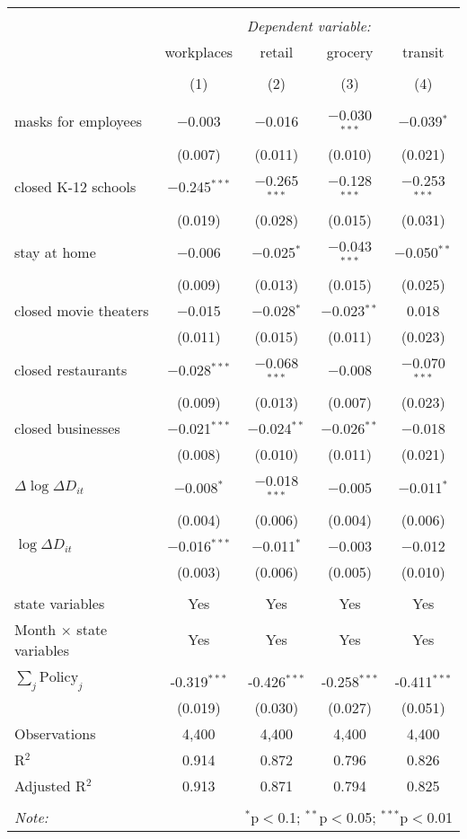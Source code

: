 \begin{tabular}{@{\extracolsep{1pt}}lcccc} 
\\[-1.8ex]\hline 
\hline \\[-1.8ex] 
 & \multicolumn{4}{c}{\textit{Dependent variable:}} \\ 
\cline{2-5} 
 & workplaces & retail & grocery & transit \\ 
\\[-1.8ex] & (1) & (2) & (3) & (4)\\ 
\hline \\[-1.8ex] 
 masks for employees & $-$0.003 & $-$0.016 & $-$0.030$^{***}$ & $-$0.039$^{*}$ \\ 
  & (0.007) & (0.011) & (0.010) & (0.021) \\ 
  closed K-12 schools & $-$0.245$^{***}$ & $-$0.265$^{***}$ & $-$0.128$^{***}$ & $-$0.253$^{***}$ \\ 
  & (0.019) & (0.028) & (0.015) & (0.031) \\ 
  stay at home & $-$0.006 & $-$0.025$^{*}$ & $-$0.043$^{***}$ & $-$0.050$^{**}$ \\ 
  & (0.009) & (0.013) & (0.015) & (0.025) \\ 
  closed movie theaters & $-$0.015 & $-$0.028$^{*}$ & $-$0.023$^{**}$ & 0.018 \\ 
  & (0.011) & (0.015) & (0.011) & (0.023) \\ 
  closed restaurants & $-$0.028$^{***}$ & $-$0.068$^{***}$ & $-$0.008 & $-$0.070$^{***}$ \\ 
  & (0.009) & (0.013) & (0.007) & (0.023) \\ 
  closed businesses & $-$0.021$^{***}$ & $-$0.024$^{**}$ & $-$0.026$^{**}$ & $-$0.018 \\ 
  & (0.008) & (0.010) & (0.011) & (0.021) \\ 
  $\Delta \log \Delta D_{it}$ & $-$0.008$^{*}$ & $-$0.018$^{***}$ & $-$0.005 & $-$0.011$^{*}$ \\ 
  & (0.004) & (0.006) & (0.004) & (0.006) \\ 
  $\log \Delta D_{it}$ & $-$0.016$^{***}$ & $-$0.011$^{*}$ & $-$0.003 & $-$0.012 \\ 
  & (0.003) & (0.006) & (0.005) & (0.010) \\ 
 \hline \\[-1.8ex] 
state variables & Yes & Yes & Yes & Yes \\ 
Month $\times$ state variables & Yes & Yes & Yes & Yes \\ 
\hline \\[-1.8ex] 
$\sum_j \mathrm{Policy}_j$ & -0.319$^{***}$ & -0.426$^{***}$ & -0.258$^{***}$ & -0.411$^{***}$ \\ 
 & (0.019) & (0.030) & (0.027) & (0.051) \\ 
Observations & 4,400 & 4,400 & 4,400 & 4,400 \\ 
R$^{2}$ & 0.914 & 0.872 & 0.796 & 0.826 \\ 
Adjusted R$^{2}$ & 0.913 & 0.871 & 0.794 & 0.825 \\ 
\hline 
\hline \\[-1.8ex] 
\textit{Note:}  & \multicolumn{4}{r}{$^{*}$p$<$0.1; $^{**}$p$<$0.05; $^{***}$p$<$0.01} \\ 
\end{tabular} 